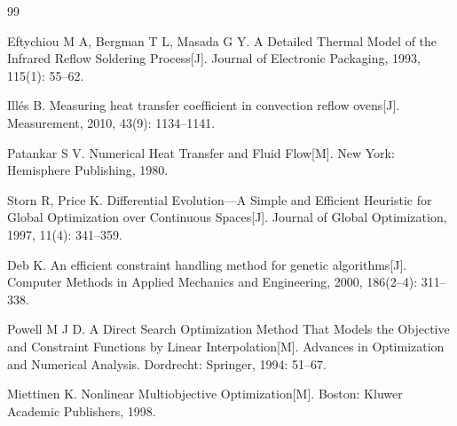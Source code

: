 \begin{thebibliography}{99}
\footnotesize

Eftychiou M A, Bergman T L, Masada G Y. A Detailed Thermal Model of the Infrared Reflow Soldering Process[J]. Journal of Electronic Packaging, 1993, 115(1): 55--62.

Ill\'{e}s B. Measuring heat transfer coefficient in convection reflow ovens[J]. Measurement, 2010, 43(9): 1134--1141.

Patankar S V. Numerical Heat Transfer and Fluid Flow[M]. New York: Hemisphere Publishing, 1980.

Storn R, Price K. Differential Evolution---A Simple and Efficient Heuristic for Global Optimization over Continuous Spaces[J]. Journal of Global Optimization, 1997, 11(4): 341--359.

Deb K. An efficient constraint handling method for genetic algorithms[J]. Computer Methods in Applied Mechanics and Engineering, 2000, 186(2--4): 311--338.

Powell M J D. A Direct Search Optimization Method That Models the Objective and Constraint Functions by Linear Interpolation[M]. Advances in Optimization and Numerical Analysis. Dordrecht: Springer, 1994: 51--67.

Miettinen K. Nonlinear Multiobjective Optimization[M]. Boston: Kluwer Academic Publishers, 1998.

\end{thebibliography}
